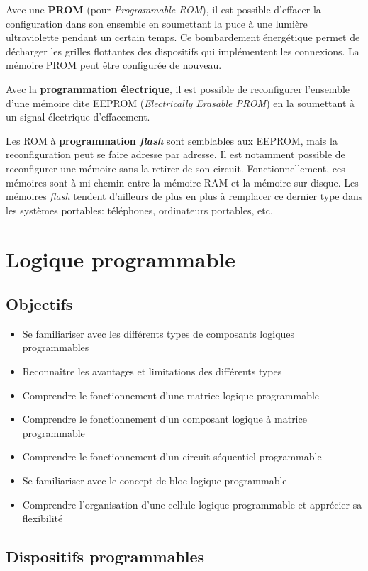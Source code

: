 \documentclass[11pt]{article}
\begin{document}
Avec une \textbf{PROM} (pour \emph{Programmable ROM}), il est possible d'effacer la
configuration dans son ensemble en soumettant la puce à une lumière
ultraviolette pendant un certain temps. Ce bombardement énergétique
permet de décharger les grilles flottantes des dispositifs qui
implémentent les connexions. La mémoire PROM peut être configurée de
nouveau.

Avec la \textbf{programmation électrique}, il est possible de reconfigurer
l'ensemble d'une mémoire dite EEPROM (\emph{Electrically Erasable PROM})
en la soumettant à un signal électrique d'effacement. 

Les ROM à \textbf{programmation \emph{flash}} sont semblables aux EEPROM, mais la
reconfiguration peut se faire adresse par adresse.  Il est notamment
possible de reconfigurer une mémoire sans la retirer de son circuit.
Fonctionnellement, ces mémoires sont à mi-chemin entre la mémoire RAM
et la mémoire sur disque. Les mémoires \emph{flash} tendent d'ailleurs de
plus en plus à remplacer ce dernier type dans les systèmes portables:
téléphones, ordinateurs portables, etc.

\section{Logique programmable}
\label{sec:orgd08b24c}
\subsection{Objectifs}
\label{sec:org22e6c47}
\begin{itemize}
\item Se familiariser avec les différents types de composants logiques
programmables
\item Reconnaître les avantages et limitations des différents types
\item Comprendre le fonctionnement d'une matrice logique programmable
\item Comprendre le fonctionnement d'un composant logique à matrice programmable
\item Comprendre le fonctionnement d'un circuit séquentiel programmable
\item Se familiariser avec le concept de bloc logique programmable
\item Comprendre l'organisation d'une cellule logique programmable et
apprécier sa flexibilité
\end{itemize}

\subsection{Dispositifs programmables}
\label{sec:org77a08f6}
\end{document}
